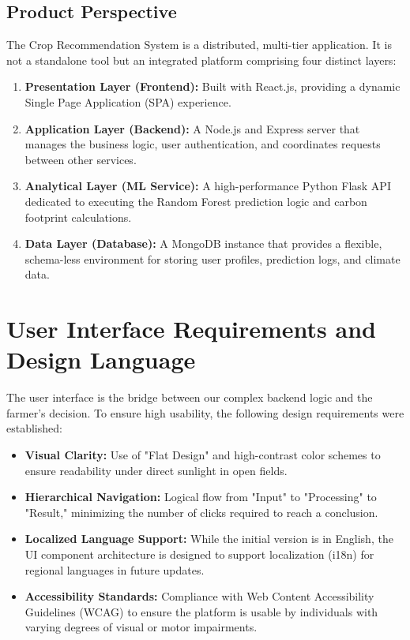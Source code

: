 \documentclass[12pt,a4paper]{report}
\begin{document}
\subsection{Product Perspective}
The Crop Recommendation System is a distributed, multi-tier application. It is not a standalone tool but an integrated platform comprising four distinct layers:
\begin{enumerate}
    \item \textbf{Presentation Layer (Frontend):} Built with React.js, providing a dynamic Single Page Application (SPA) experience.
    \item \textbf{Application Layer (Backend):} A Node.js and Express server that manages the business logic, user authentication, and coordinates requests between other services.
    \item \textbf{Analytical Layer (ML Service):} A high-performance Python Flask API dedicated to executing the Random Forest prediction logic and carbon footprint calculations.
    \item \textbf{Data Layer (Database):} A MongoDB instance that provides a flexible, schema-less environment for storing user profiles, prediction logs, and climate data.
\end{enumerate}

\section{User Interface Requirements and Design Language}
The user interface is the bridge between our complex backend logic and the farmer's decision. To ensure high usability, the following design requirements were established:
\begin{itemize}
    \item \textbf{Visual Clarity:} Use of "Flat Design" and high-contrast color schemes to ensure readability under direct sunlight in open fields.
    \item \textbf{Hierarchical Navigation:} Logical flow from "Input" to "Processing" to "Result," minimizing the number of clicks required to reach a conclusion.
    \item \textbf{Localized Language Support:} While the initial version is in English, the UI component architecture is designed to support localization (i18n) for regional languages in future updates.
    \item \textbf{Accessibility Standards:} Compliance with Web Content Accessibility Guidelines (WCAG) to ensure the platform is usable by individuals with varying degrees of visual or motor impairments.
\end{itemize}
\end{document}
